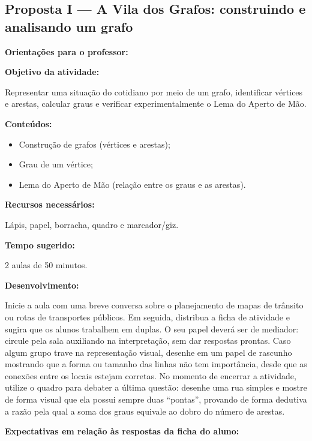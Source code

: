 \documentclass[
  12pt,
  oneside,
  a4paper,
  english,
  brazilian
  ]{abntex2}
\theoremstyle{definition}
\begin{document}
\begin{apendicesenv}
\partapendices

\chapter{Proposta I --- A Vila dos Grafos: construindo e analisando um grafo}
\label{apendice:vila}

\textbf{Orientações para o professor:}

\textbf{Objetivo da atividade:}

Representar uma situação do cotidiano por meio de um grafo, identificar vértices e arestas, calcular graus e verificar experimentalmente o Lema do Aperto de Mão.

\textbf{Conteúdos:}

\begin{itemize}[noitemsep]
  \item Construção de grafos (vértices e arestas);
  \item Grau de um vértice;
  \item Lema do Aperto de Mão (relação entre os graus e as arestas).
\end{itemize}

\textbf{Recursos necessários:}

Lápis, papel, borracha, quadro e marcador/giz.

\textbf{Tempo sugerido:}

2 aulas de 50 minutos.

\textbf{Desenvolvimento:}

Inicie a aula com uma breve conversa sobre o planejamento de mapas de trânsito ou rotas de transportes públicos. Em seguida, distribua a ficha de atividade e sugira que os alunos trabalhem em duplas. O seu papel deverá ser de mediador: circule pela sala auxiliando na interpretação, sem dar respostas prontas. Caso algum grupo trave na representação visual, desenhe em um papel de rascunho mostrando que a forma ou tamanho das linhas não tem importância, desde que as conexões entre os locais estejam corretas. No momento de encerrar a atividade, utilize o quadro para debater a última questão: desenhe uma rua simples e mostre de forma visual que ela possui sempre duas ``pontas'', provando de forma dedutiva a razão pela qual a soma dos graus equivale ao dobro do número de arestas.

\textbf{Expectativas em relação às respostas da ficha do aluno:}


\end{apendicesenv}
\end{document}

